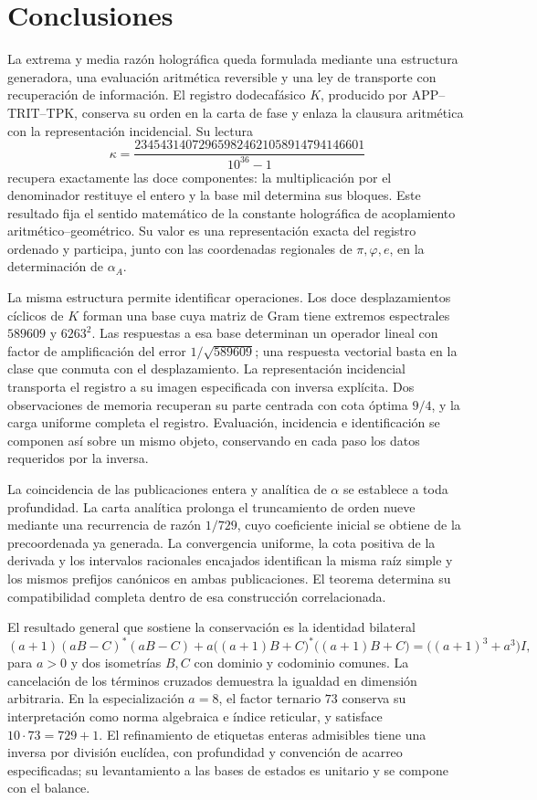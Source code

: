 \section{Conclusiones}
\label{paper:conclusiones}
La extrema y media razón holográfica queda formulada mediante una estructura generadora, una evaluación aritmética reversible y una ley de transporte con recuperación de información. El registro dodecafásico \(K\), producido por APP--TRIT--TPK, conserva su orden en la carta de fase y enlaza la clausura aritmética con la representación incidencial. Su lectura
\[
\kappa=
\frac{234543140729659824621058914794146601}{10^{36}-1}
\]
recupera exactamente las doce componentes: la multiplicación por el denominador restituye el entero y la base mil determina sus bloques. Este resultado fija el sentido matemático de la constante holográfica de acoplamiento aritmético--geométrico. Su valor es una representación exacta del registro ordenado y participa, junto con las coordenadas regionales de \(\pi,\varphi,e\), en la determinación de \(\alpha_A\).

La misma estructura permite identificar operaciones. Los doce desplazamientos cíclicos de \(K\) forman una base cuya matriz de Gram tiene extremos espectrales \(589609\) y \(6263^2\). Las respuestas a esa base determinan un operador lineal con factor de amplificación del error \(1/\sqrt{589609}\); una respuesta vectorial basta en la clase que conmuta con el desplazamiento. La representación incidencial transporta el registro a su imagen especificada con inversa explícita. Dos observaciones de memoria recuperan su parte centrada con cota óptima \(9/4\), y la carga uniforme completa el registro. Evaluación, incidencia e identificación se componen así sobre un mismo objeto, conservando en cada paso los datos requeridos por la inversa.

La coincidencia de las publicaciones entera y analítica de \(\alpha\) se establece a toda profundidad. La carta analítica prolonga el truncamiento de orden nueve mediante una recurrencia de razón \(1/729\), cuyo coeficiente inicial se obtiene de la precoordenada ya generada. La convergencia uniforme, la cota positiva de la derivada y los intervalos racionales encajados identifican la misma raíz simple y los mismos prefijos canónicos en ambas publicaciones. El teorema determina su compatibilidad completa dentro de esa construcción correlacionada.

El resultado general que sostiene la conservación es la identidad bilateral
\[
 (a+1)(aB-C)^*(aB-C)
 +a\bigl((a+1)B+C\bigr)^*\bigl((a+1)B+C\bigr)
 =\bigl((a+1)^3+a^3\bigr)I,
\]
para \(a>0\) y dos isometrías \(B,C\) con dominio y codominio comunes. La cancelación de los términos cruzados demuestra la igualdad en dimensión arbitraria. En la especialización \(a=8\), el factor ternario \(73\) conserva su interpretación como norma algebraica e índice reticular, y satisface \(10\cdot73=729+1\). El refinamiento de etiquetas enteras admisibles tiene una inversa por división euclídea, con profundidad y convención de acarreo especificadas; su levantamiento a las bases de estados es unitario y se compone con el balance.


